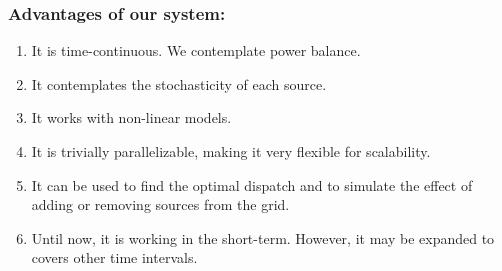 \documentclass[aspectratio=169]{beamer}\usepackage[utf8]{inputenc}
\begin{document}
\begin{frame}\frametitle{Advantages of our system:}

\begin{enumerate}

\item It is time-continuous. We contemplate power balance.

\item It contemplates the stochasticity of each source.

\item It works with non-linear models.

\item It is trivially parallelizable, making it very flexible for scalability.

\item It can be used to find the optimal dispatch and to simulate the effect of adding or removing sources from the grid.

\item Until now, it is working in the short-term. However, it may be expanded to covers other time intervals.


\end{enumerate}

\end{frame}
\end{document}
